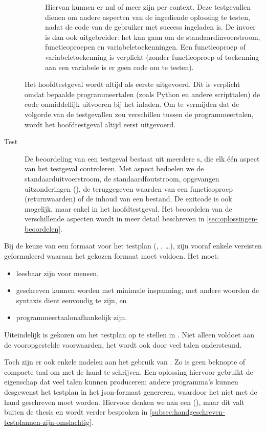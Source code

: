 \begin{description}
\begin{description}
        Hiervan kunnen er nul of meer zijn per context.
        Deze testgevallen dienen om andere aspecten van de ingediende oplossing te testen, nadat de code van de gebruiker met success ingeladen is.
        De invoer is dan ook uitgebreider: het kan gaan om de standaardinvoerstroom, functieoproepen en variabeletoekenningen.
        Een functieoproep of variabeletoekenning is verplicht (zonder functieoproep of toekenning aan een variabele is er geen code om te testen).
    \end{description}
    Het hoofdtestgeval wordt altijd als eerste uitgevoerd.
    Dit is verplicht omdat bepaalde programmeertalen (zoals Python en andere scripttalen) de code onmiddellijk uitvoeren bij het inladen.
    Om te vermijden dat de volgorde van de testgevallen zou verschillen tussen de programmeertalen, wordt het hoofdtestgeval altijd eerst uitgevoerd.
    \item[Test] De beoordeling van een testgeval bestaat uit meerdere s, die elk één aspect van het testgeval controleren.
    Met aspect bedoelen we de standaarduitvoerstroom, de standaardfoutstroom, opgevangen uitzonderingen (), de teruggegeven waarden van een functieoproep (returnwaarden) of de inhoud van een bestand.
    De exitcode is ook mogelijk, maar enkel in het hoofdtestgeval.
    Het beoordelen van de verschillende aspecten wordt in meer detail beschreven in \cref{sec:oplossingen-beoordelen}.
\end{description}

Bij de keuze van een formaat voor het testplan (, , \ldots), zijn vooraf enkele vereisten geformuleerd waaraan het gekozen formaat moet voldoen.
Het moet:

\begin{itemize}
    \item leesbaar zijn voor mensen,
    \item geschreven kunnen worden met minimale inspanning, met andere woorden de syntaxis dient eenvoudig te zijn, en
    \item programmeertaalonafhankelijk zijn.
\end{itemize}

Uiteindelijk is gekozen om het testplan op te stellen in .
Niet alleen voldoet  aan de vooropgestelde voorwaarden, het wordt ook door veel talen ondersteund.

Toch zijn er ook enkele nadelen aan het gebruik van .
Zo is  geen beknopte of compacte taal om met de hand te schrijven.
Een oplossing hiervoor gebruikt de eigenschap dat veel talen  kunnen produceren: andere programma's kunnen desgewenst het testplan in het json-formaat genereren, waardoor het niet met de hand geschreven moet worden.
Hiervoor denken we aan een  (), maar dit valt buiten de thesis en wordt verder besproken in \cref{subsec:handgeschreven-testplannen-zijn-omslachtig}.


